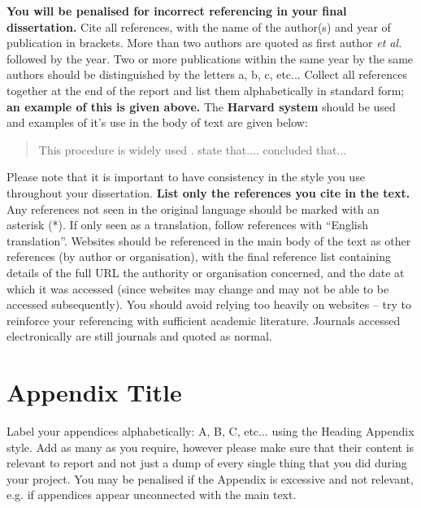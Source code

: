 \documentclass[a4paper,12pt]{article}
\begin{document}
\vspace*{10mm}

\textbf{You will be penalised for incorrect referencing in your final dissertation.} Cite all references, with the name of the author(s) and year of publication in brackets. More than
two authors are quoted as first author \textit{et al.} followed by the year.  Two or more publications within
the same year by the same authors should be distinguished by the letters a, b, c, etc... Collect all
references together at the end of the report and list them alphabetically in standard form; \textbf{an
example of this is given above.} The \textbf{Harvard system} should be used and examples of it’s use in the body of text are given below:


\begin{quote}
This procedure is widely used \citep{Christou2009,Wu2016,Hughes2016a,Hughes2016b}. \citet{Christou2014} state that.... \citet{Spinneken2009a,Spinneken2009b} concluded that...
\end{quote}


Please note that it is important to have consistency in the style you use throughout your dissertation. \textbf{List only the references you cite in the text.} Any references not seen in the original language should be marked with an asterisk (*). If only seen as a translation, follow references with ``English translation''. Websites should be referenced in the main body of the text as other references (by author or organisation), with the final reference list containing details of the full URL the authority or organisation concerned, and the date at which it was accessed (since websites may change and may not be able to be accessed subsequently). You should avoid relying too heavily on websites – try to reinforce your referencing with sufficient academic literature. Journals accessed electronically are still journals and quoted as normal.


\clearpage


\appendix

\section{Appendix Title}
\label{sec:appendix}

Label your appendices alphabetically: A, B, C, etc... using the Heading Appendix style. Add as many as you require, however please make sure that their content is relevant to report and not just a dump of every single thing that you did during your project. You may be penalised if the Appendix is excessive and not relevant, e.g. if appendices appear unconnected with the main text.
\end{document}
